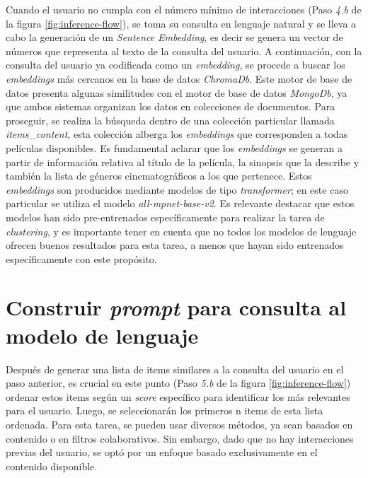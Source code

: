 \documentclass[11pt,a4paper,twoside]{thesis}
\begin{document}
Cuando el usuario no cumpla con el número mínimo de interacciones (Paso \textit{4.b} de la figura \ref{fig:inference-flow}), se toma su consulta en lenguaje natural y se lleva a cabo la generación de un \textit{Sentence Embedding}, es decir se genera un vector de números que representa al texto de la consulta del usuario. A continuación, con la consulta del usuario ya codificada como un \textit{embedding}, se procede a buscar los \textit{embeddings} más cercanos en la base de datos \textit{ChromaDb}. Este motor de base de datos presenta algunas similitudes con el motor de base de datos \textit{MongoDb}, ya que ambos sistemas organizan los datos en colecciones de documentos. Para proseguir, se realiza la búsqueda dentro de una colección particular llamada \textit{items\_content}, esta colección alberga los \textit{embeddings} que corresponden a todas películas disponibles. Es fundamental aclarar que los \textit{embeddings} se generan a partir de información relativa al título de la película, la sinopsis que la describe y también la lista de géneros cinematográficos a los que pertenece. Estos \textit{embeddings} son producidos mediante modelos de tipo \textit{transformer}; en este caso particular se utiliza el modelo \textit{all-mpnet-base-v2}. Es relevante destacar que estos modelos han sido pre-entrenados específicamente para realizar la tarea de \textit{clustering}, y es importante tener en cuenta que no todos los modelos de lenguaje ofrecen buenos resultados para esta tarea, a menos que hayan sido entrenados específicamente con este propósito.

\section{Construir \textit{prompt} para consulta al modelo de lenguaje}

Después de generar una lista de items similares a la consulta del usuario en el paso anterior, es crucial en este punto (Paso \textit{5.b} de la figura \ref{fig:inference-flow}) ordenar estos items según un \textit{score} específico para identificar los más relevantes para el usuario. Luego, se seleccionarán los primeros n items de esta lista ordenada. Para esta tarea, se pueden usar diversos métodos, ya sean basados en contenido o en filtros colaborativos. Sin embargo, dado que no hay interacciones previas del usuario, se optó por un enfoque basado exclusivamente en el contenido disponible.
\end{document}
